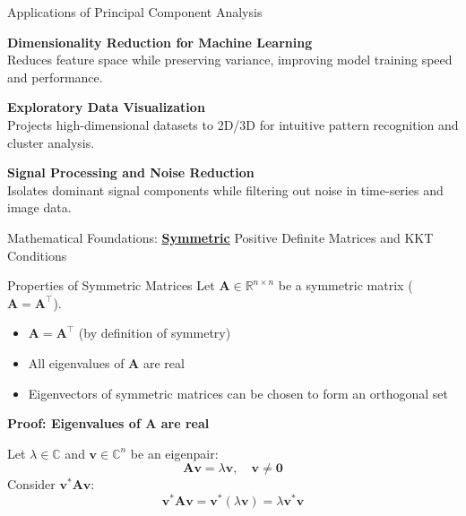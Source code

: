 \documentclass{beamer}
\begin{document}
\begin{frame}{Applications of Principal Component Analysis}
    \vspace{0.5cm}
    
    \large\textbf{Dimensionality Reduction for Machine Learning}\\
    Reduces feature space while preserving variance, improving model training speed and performance.\\
    
    \vspace{0.5cm}
    
    \large\textbf{Exploratory Data Visualization}\\
    Projects high-dimensional datasets to 2D/3D for intuitive pattern recognition and cluster analysis.\\
    
    \vspace{0.5cm}
    
    \large\textbf{Signal Processing and Noise Reduction}\\
    Isolates dominant signal components while filtering out noise in time-series and image data.\\
    
\end{frame}

\begin{frame}{Mathematical Foundations: \textbf{\underline{Symmetric}} Positive Definite Matrices and KKT Conditions}

\begin{block}{Properties of Symmetric Matrices}
    Let $\bm{A} \in \mathbb{R}^{n \times n}$ be a symmetric matrix ($\bm{A} = \bm{A}^{\top}$).
    
    \begin{itemize}
        \item $\bm{A} = \bm{A}^{\top}$ (by definition of symmetry)
        \item All eigenvalues of $\bm{A}$ are real
        \item Eigenvectors of symmetric matrices can be chosen to form an orthogonal set
    \end{itemize}
\end{block}

\vspace{0.3cm}

\textbf{Proof: Eigenvalues of $\bm{A}$ are real}  

Let $\lambda \in \mathbb{C}$ and $\bm{v} \in \mathbb{C}^n$ be an eigenpair:
\[
\bm{A}\bm{v} = \lambda \bm{v}, \quad \bm{v} \neq \bm{0}
\]
Consider $\bm{v}^* \bm{A} \bm{v}$:
\[
\bm{v}^* \bm{A} \bm{v} = \bm{v}^* (\lambda \bm{v}) = \lambda \bm{v}^* \bm{v}
\]

\end{frame}
\end{document}
